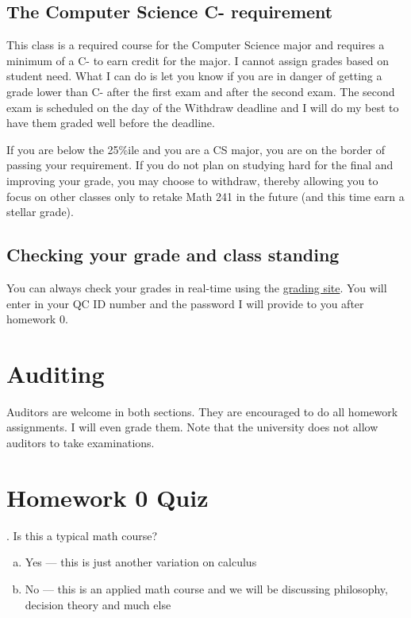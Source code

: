\documentclass[12pt]{article}
\begin{document}
\subsection*{The Computer Science C- requirement}

This class is a required course for the Computer Science major and requires a minimum of a C- to earn credit for the major. I cannot assign grades based on student need. What I can do is let you know if you are in danger of getting a grade lower than C- after the first exam and after the second exam. The second exam is scheduled on the day of the Withdraw deadline and I will do my best to have them graded well before the deadline. 

If you are below the 25\%ile and you are a CS major, you are on the border of passing your requirement. If you do not plan on studying hard for the final and improving your grade, you may choose to withdraw, thereby allowing you to focus on other classes only to retake Math 241 in the future (and this time earn a stellar grade).

\subsection*{Checking your grade and class standing}

You can always check your grades in real-time using the \href{http://gradesly.com}{grading site}. You will enter in your QC ID number and the password I will provide to you after homework 0.



\section*{Auditing}

Auditors are welcome in both sections. They are encouraged to do all homework assignments. I will even grade them. Note that the university does not allow auditors to take examinations.


\section*{Homework 0 Quiz}\label{quiz}

. Is this a typical math course?

\begin{enumerate}[(a)]
\item Yes --- this is just another variation on calculus
\item No --- this is an applied math course and we will be discussing philosophy, decision theory and much else
\end{enumerate}
\end{document}
